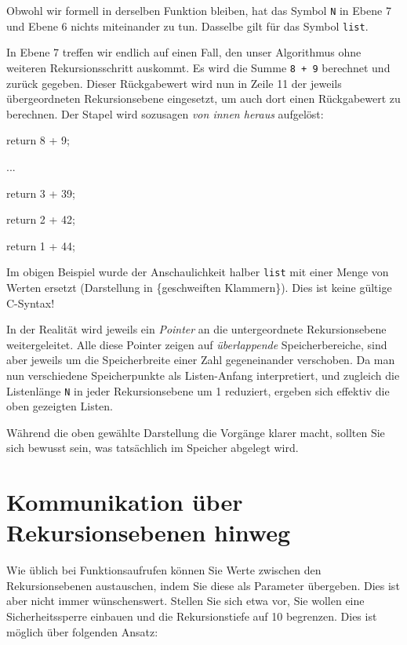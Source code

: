 Obwohl wir formell in derselben Funktion bleiben, hat das Symbol \texttt{N} in Ebene 7 und Ebene 6 nichts miteinander zu tun. Dasselbe gilt für das Symbol \texttt{list}.

In Ebene 7 treffen wir endlich auf einen Fall, den unser Algorithmus ohne weiteren Rekursionsschritt auskommt. Es wird die Summe \texttt{8 + 9} berechnet und zurück gegeben. Dieser Rückgabewert wird nun in Zeile 11 der jeweils übergeordneten Rekursionsebene eingesetzt, um auch dort einen Rückgabewert zu berechnen. Der Stapel wird sozusagen \emph{von innen heraus} aufgelöst:

\begin{codebox}
\begin{codebox}
\begin{codebox}
\begin{codebox}[Rekursionsstufe 3-6]
\begin{codebox}
return 8 + 9;
\end{codebox}
...
\end{codebox}
return 3 + 39;
\end{codebox}
return 2 + 42;
\end{codebox}
return 1 + 44;
\end{codebox}

\begin{warnbox}
Im obigen Beispiel wurde der Anschaulichkeit halber \texttt{list} mit einer Menge von Werten ersetzt (Darstellung in \{geschweiften Klammern\}). Dies ist keine gültige C-Syntax!

In der Realität wird jeweils ein \emph{Pointer} an die untergeordnete Rekursionsebene weitergeleitet. Alle diese Pointer zeigen auf \emph{überlappende} Speicherbereiche, sind aber jeweils um die Speicherbreite einer Zahl gegeneinander verschoben. Da man nun verschiedene Speicherpunkte als Listen-Anfang interpretiert, und zugleich die Listenlänge \texttt{N} in jeder Rekursionsebene um 1 reduziert, ergeben sich effektiv die oben gezeigten Listen.

Während die oben gewählte Darstellung die Vorgänge klarer macht, sollten Sie sich bewusst sein, was tatsächlich im Speicher abgelegt wird.
\end{warnbox}

\section{Kommunikation über Rekursionsebenen hinweg}
Wie üblich bei Funktionsaufrufen können Sie Werte zwischen den Rekursionsebenen austauschen, indem Sie diese als Parameter übergeben. Dies ist aber nicht immer wünschenswert. Stellen Sie sich etwa vor, Sie wollen eine Sicherheitssperre einbauen und die Rekursionstiefe auf 10 begrenzen. Dies ist möglich über folgenden Ansatz:

